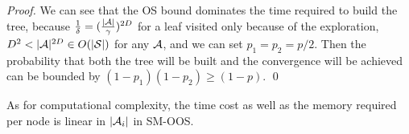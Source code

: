 {\begin{proof}
We can see that the OS bound dominates the time required to build the tree, because $\frac{1}{\delta}=(\frac{|\mathcal{A}|}{\gamma})^{2D}$ for a leaf visited only because of the exploration, $D^2 < |\mathcal{A}|^{2D} \in O(|\mathcal{S}|)$ for any $\mathcal{A}$, and we can set $p_1=p_2=p/2$. Then the probability that both the tree will be built and the convergence will be achieved can be bounded by $(1-p_1)(1-p_2) \geq (1-p)$. \qed
\end{proof}
As for computational complexity, the time cost as well as the memory required per node is linear in $|\mathcal{A}_i|$ in SM-OOS.

}

%
%

